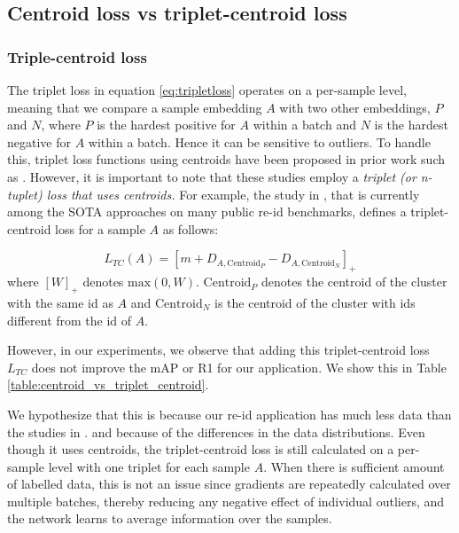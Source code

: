 \documentclass{article}
\begin{document}
\subsection{Centroid loss vs triplet-centroid loss}



\subsubsection{Triple-centroid loss}

The triplet loss in equation \ref{eq:tripletloss} operates on a per-sample level, meaning that we compare a sample embedding $A$ with two other embeddings, $P$ and $N$, where $P$ is the hardest positive for $A$ within a batch and $N$ is the hardest negative for $A$ within a batch. Hence it can be sensitive to outliers. To handle this, triplet loss functions using centroids have been proposed in prior work such as \cite{do2019theoretically, yuan2020defense, zhang2020beyond, wang2019centroid, lagunes2020centroids, wieczorek2021unreasonable, alnissany2022modified}. However, it is important to note that these studies employ a \emph{triplet (or n-tuplet) loss that uses centroids.} For example, the study in \cite{wieczorek2021unreasonable}, that is currently among the SOTA approaches on many public re-id benchmarks, defines a triplet-centroid loss for a sample $A$ as follows:

\begin{equation}
\label{eq:triplet_centroid}
    L_{TC}(A) = [m + D_{A,\text{Centroid}_P} - D_{A, \text{Centroid}_N}]_{+}
\end{equation}
where $[W]_+$ denotes $\text{max}(0, W)$. $\text{Centroid}_P$ denotes the centroid of the cluster with the same id as $A$ and $\text{Centroid}_N$ is the centroid of the cluster with ids different from the id of $A$. 

However, in our experiments, we observe that adding this triplet-centroid loss $L_{TC}$ does not improve the mAP or R1 for our application. We show this in Table \ref{table:centroid_vs_triplet_centroid}. 

We hypothesize that this is because our re-id application has much less data than the studies in \cite{do2019theoretically, yuan2020defense, zhang2020beyond, wang2019centroid, lagunes2020centroids, wieczorek2021unreasonable, alnissany2022modified}.
and because of the differences in the data distributions. 
Even though it uses centroids, the triplet-centroid loss is still calculated on a per-sample level with one triplet for each sample $A$. When there is sufficient amount of labelled data, this is not an issue since gradients are repeatedly calculated over multiple batches, thereby reducing any negative effect of individual outliers, and the network learns to average information over the samples.
\end{document}
